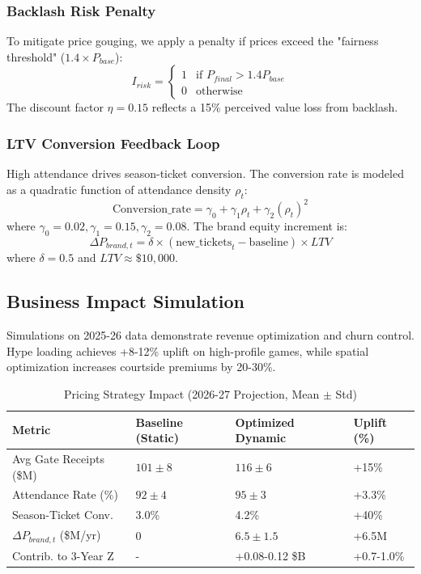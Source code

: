 \documentclass[12pt]{article}
\begin{document}
\subsubsection{Backlash Risk Penalty}
To mitigate price gouging, we apply a penalty if prices exceed the "fairness threshold" ($1.4 \times P_{base}$):
\begin{equation}
I_{risk} = \begin{cases} 
1 & \text{if } P_{final} > 1.4 P_{base} \\
0 & \text{otherwise}
\end{cases}
\end{equation}
The discount factor $\eta=0.15$ reflects a 15\% perceived value loss from backlash.

\subsubsection{LTV Conversion Feedback Loop}
High attendance drives season-ticket conversion. The conversion rate is modeled as a quadratic function of attendance density $\rho_t$:
\begin{equation}
\text{Conversion\_rate} = \gamma_0 + \gamma_1 \rho_t + \gamma_2 (\rho_t)^2
\end{equation}
where $\gamma_0=0.02, \gamma_1=0.15, \gamma_2=0.08$. The brand equity increment is:
\begin{equation}
\Delta P_{brand,t} = \delta \times (\text{new\_tickets}_t - \text{baseline}) \times LTV
\end{equation}
where $\delta=0.5$ and $LTV \approx \$10,000$.

\subsection{Business Impact Simulation}
Simulations on 2025-26 data demonstrate revenue optimization and churn control. Hype loading achieves +8-12\% uplift on high-profile games, while spatial optimization increases courtside premiums by 20-30\%.

\begin{table}[H]
\centering
\caption{Pricing Strategy Impact (2026-27 Projection, Mean $\pm$ Std)}
\begin{tabular}{llll}
\toprule
\textbf{Metric} & \textbf{Baseline (Static)} & \textbf{Optimized Dynamic} & \textbf{Uplift (\%)} \\
\midrule
Avg Gate Receipts (\$M) & $101 \pm 8$ & $116 \pm 6$ & +15\% \\
Attendance Rate (\%) & $92 \pm 4$ & $95 \pm 3$ & +3.3\% \\
Season-Ticket Conv. & 3.0\% & 4.2\% & +40\% \\
$\Delta P_{brand,t}$ (\$M/yr) & 0 & $6.5 \pm 1.5$ & +6.5M \\
Contrib. to 3-Year Z & - & +0.08-0.12 \$B & +0.7-1.0\% \\
\bottomrule
\end{tabular}
\end{table}
\end{document}
